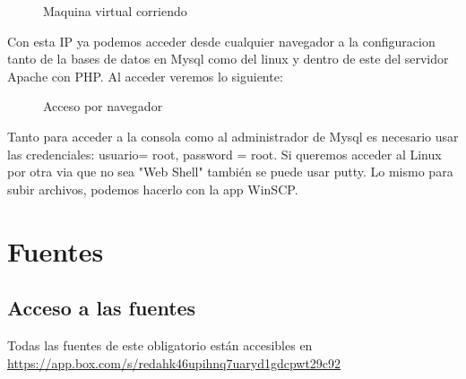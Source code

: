     \begin{figure} [H]
            \centering
            \caption{Maquina virtual corriendo}
    \end{figure}
    
    
    Con esta IP ya podemos acceder desde cualquier navegador a la configuracion tanto de la bases de datos en Mysql como del linux y dentro de este del servidor Apache con PHP.
    \clearpage
    Al acceder veremos lo siguiente:
    \begin{figure} [H]
            \centering
            \caption{Acceso por navegador}
    \end{figure}
    
    Tanto para acceder a la consola como al administrador de Mysql es necesario usar las credenciales: usuario= root, password = root.
    Si queremos acceder al Linux por otra via que no sea "Web Shell" también se puede usar putty. Lo mismo para subir archivos, podemos hacerlo con la app WinSCP.
    
\chapter{Fuentes}
    \section{Acceso a las fuentes}
    Todas las fuentes de este obligatorio están accesibles en
    \url{https://app.box.com/s/redahk46upihnq7uaryd1gdcpwt29c92}
